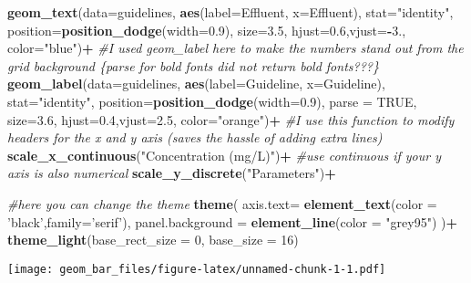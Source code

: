 \documentclass[
]{article}
\newenvironment{Shaded}{\begin{snugshade}}{\end{snugshade}}
\newcommand{\CommentTok}[1]{\textcolor[rgb]{0.56,0.35,0.01}{\textit{#1}}}
\newcommand{\DataTypeTok}[1]{\textcolor[rgb]{0.13,0.29,0.53}{#1}}
\newcommand{\DecValTok}[1]{\textcolor[rgb]{0.00,0.00,0.81}{#1}}
\newcommand{\FloatTok}[1]{\textcolor[rgb]{0.00,0.00,0.81}{#1}}
\newcommand{\KeywordTok}[1]{\textcolor[rgb]{0.13,0.29,0.53}{\textbf{#1}}}
\newcommand{\NormalTok}[1]{#1}
\newcommand{\OperatorTok}[1]{\textcolor[rgb]{0.81,0.36,0.00}{\textbf{#1}}}
\newcommand{\OtherTok}[1]{\textcolor[rgb]{0.56,0.35,0.01}{#1}}
\newcommand{\StringTok}[1]{\textcolor[rgb]{0.31,0.60,0.02}{#1}}
\begin{document}
\begin{Shaded}
\begin{Highlighting}[]
\StringTok{  }\KeywordTok{geom_text}\NormalTok{(}\DataTypeTok{data=}\NormalTok{guidelines, }\KeywordTok{aes}\NormalTok{(}\DataTypeTok{label=}\NormalTok{Effluent, }\DataTypeTok{x=}\NormalTok{Effluent), }\DataTypeTok{stat=}\StringTok{"identity"}\NormalTok{, }\DataTypeTok{position=}\KeywordTok{position_dodge}\NormalTok{(}\DataTypeTok{width=}\FloatTok{0.9}\NormalTok{), }\DataTypeTok{size=}\FloatTok{3.5}\NormalTok{, }\DataTypeTok{hjust=}\FloatTok{0.6}\NormalTok{,}\DataTypeTok{vjust=}\OperatorTok{-}\FloatTok{3.}\NormalTok{, }\DataTypeTok{color=}\StringTok{"blue"}\NormalTok{)}\OperatorTok{+}
\StringTok{  }
\StringTok{  }\CommentTok{#I used geom_label here to make the numbers stand out from the grid background \{parse for bold fonts did not return bold fonts???\}}
\StringTok{  }\KeywordTok{geom_label}\NormalTok{(}\DataTypeTok{data=}\NormalTok{guidelines, }\KeywordTok{aes}\NormalTok{(}\DataTypeTok{label=}\NormalTok{Guideline, }\DataTypeTok{x=}\NormalTok{Guideline), }\DataTypeTok{stat=}\StringTok{"identity"}\NormalTok{, }\DataTypeTok{position=}\KeywordTok{position_dodge}\NormalTok{(}\DataTypeTok{width=}\FloatTok{0.9}\NormalTok{), }\DataTypeTok{parse =} \OtherTok{TRUE}\NormalTok{, }\DataTypeTok{size=}\FloatTok{3.6}\NormalTok{, }\DataTypeTok{hjust=}\FloatTok{0.4}\NormalTok{,}\DataTypeTok{vjust=}\FloatTok{2.5}\NormalTok{, }\DataTypeTok{color=}\StringTok{"orange"}\NormalTok{)}\OperatorTok{+}
\StringTok{  }
\StringTok{  }\CommentTok{#I use this function to modify headers for the x and y axis (saves the hassle of adding extra lines) }
\StringTok{  }\KeywordTok{scale_x_continuous}\NormalTok{(}\StringTok{"Concentration (mg/L)"}\NormalTok{)}\OperatorTok{+}
\StringTok{  }\CommentTok{#use continuous if your y axis is also numerical }
\StringTok{  }\KeywordTok{scale_y_discrete}\NormalTok{(}\StringTok{"Parameters"}\NormalTok{)}\OperatorTok{+}

\StringTok{  }\CommentTok{#here you can change the theme}
\StringTok{  }\KeywordTok{theme}\NormalTok{(}
    \DataTypeTok{axis.text=} \KeywordTok{element_text}\NormalTok{(}\DataTypeTok{color =} \StringTok{'black'}\NormalTok{,}\DataTypeTok{family=}\StringTok{'serif'}\NormalTok{),}
    \DataTypeTok{panel.background =} \KeywordTok{element_line}\NormalTok{(}\DataTypeTok{color =} \StringTok{"grey95"}\NormalTok{)}
\NormalTok{  )}\OperatorTok{+}
\StringTok{  }
\StringTok{  }\KeywordTok{theme_light}\NormalTok{(}\DataTypeTok{base_rect_size =} \DecValTok{0}\NormalTok{, }\DataTypeTok{base_size =} \DecValTok{16}\NormalTok{)}
\end{Highlighting}
\end{Shaded}

\texttt{[image: geom\_bar\_files/figure-latex/unnamed-chunk-1-1.pdf]}
\end{document}
